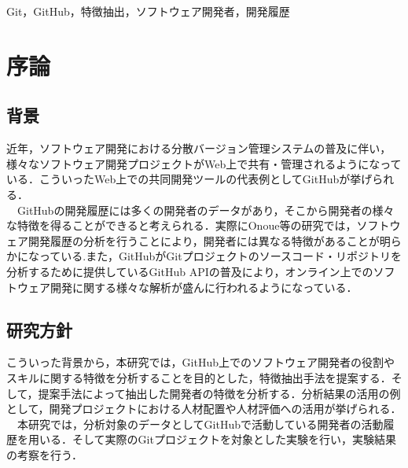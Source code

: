 \documentclass{funthesis}
\begin{document}
\begin{jkeyword}
Git，GitHub，特徴抽出，ソフトウェア開発者，開発履歴
\end{jkeyword}

\tableofcontents %


\chapter{序論} %


\section{背景} %


近年，ソフトウェア開発における分散バージョン管理システムの普及に伴い，様々なソフトウェア開発プロジェクトがWeb上で共有・管理されるようになっている．こういったWeb上での共同開発ツールの代表例としてGitHub\cite{GitHub}が挙げられる．
\\　GitHubの開発履歴には多くの開発者のデータがあり，そこから開発者の様々な特徴を得ることができると考えられる．実際にOnoue等の研究では，ソフトウェア開発履歴の分析を行うことにより，開発者には異なる特徴があることが明らかになっている\cite{Onoue_English}.また，GitHubがGitプロジェクトのソースコード・リポジトリを分析するために提供しているGitHub API\cite{GitHub_API}の普及により，オンライン上でのソフトウェア開発に関する様々な解析が盛んに行われるようになっている\cite{Characteristic}．
\section{研究方針}

こういった背景から，本研究では，GitHub上でのソフトウェア開発者の役割やスキルに関する特徴を分析することを目的とした，特徴抽出手法を提案する．そして，提案手法によって抽出した開発者の特徴を分析する．分析結果の活用の例として，開発プロジェクトにおける人材配置や人材評価への活用が挙げられる．
\\　本研究では，分析対象のデータとしてGitHubで活動している開発者の活動履歴を用いる．そして実際のGitプロジェクトを対象とした実験を行い，実験結果の考察を行う．
\end{document}
